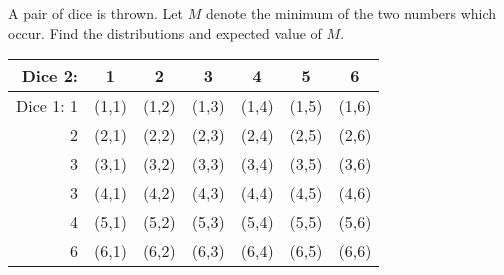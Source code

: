 \documentclass[a4paper,12pt]{article}
\begin{document}
	
\large 
\noindent		A pair of dice is thrown. Let $M$ denote the minimum of the two numbers which occur.
		Find the distributions and expected value of $M$.

\begin{center}		
\begin{tabular}{|r||c|c|c|c|c|c|}
\hline
Dice 2: & \phantom{spa}1 \phantom{spa} & 2 & 3 & 4 & 5 & 6 \\ \hline  \hline
Dice 1: 1 & \phantom{s} (1,1) \phantom{s} & \phantom{s} (1,2) \phantom{s} & \phantom{s} (1,3) \phantom{s} & \phantom{s} (1,4) \phantom{s} & \phantom{s} (1,5) \phantom{s} & \phantom{s} (1,6) \phantom{s} \\ \hline
2 & (2,1) & (2,2) & (2,3) & (2,4) & (2,5) & (2,6)  \\ \hline
3 & (3,1) & (3,2) & (3,3) & (3,4) & (3,5) & (3,6)  \\ \hline
3 & (4,1) & (4,2) & (4,3) & (4,4) & (4,5) & (4,6)  \\ \hline
4 & (5,1) & (5,2) & (5,3) & (5,4) & (5,5) & (5,6)  \\ \hline
6 & (6,1) & (6,2) & (6,3) & (6,4) & (6,5) & (6,6)  \\ \hline
\end{tabular}		
\end{center}		
		\medskip
\end{document}
